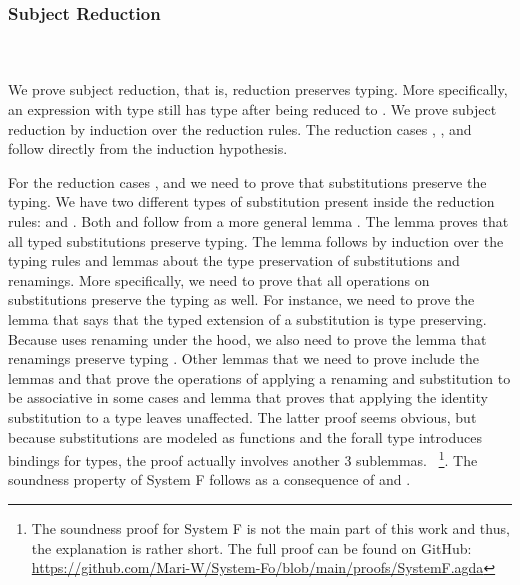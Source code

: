 \subsubsection{Subject Reduction}\hfill\\\\
We prove subject reduction, that is, reduction preserves typing. More specifically, an expression  with type  still has type  after being reduced to . We prove subject reduction by induction over the reduction rules. 
\FSubjectReduction
The  reduction cases , ,  and  follow directly from the induction hypothesis. 

\noindent For the  reduction cases ,  and  we need to prove that substitutions preserve the typing. We have two different types of substitution present inside the reduction rules:  \Data{[}  \Data{]} and  \Data{[}  \Data{]}.
Both  and  follow from a more general lemma . The lemma  proves that all typed substitutions preserve typing.
\Fpreserves
The lemma  follows by induction over the typing rules and lemmas about the type preservation of substitutions and renamings. 
More specifically, we need to prove that all operations on substitutions preserve the typing as well. 
For instance, we need to prove the lemma  that says that the typed extension of a substitution  is type preserving. Because  uses renaming under the hood, we also need to prove the lemma that renamings preserve typing . Other lemmas that we need to prove include the lemmas  and  that prove the operations of applying a renaming and substitution to be associative in some cases and lemma  that proves that applying the identity substitution to a type  leaves  unaffected. The latter proof seems obvious, but because substitutions are modeled as functions and the forall type introduces bindings for types, the proof actually involves another 3 sublemmas.
~\footnote{The soundness proof for System F is not the main part of this work and thus, the explanation is rather short. The full proof can be found on GitHub: \url{https://github.com/Mari-W/System-Fo/blob/main/proofs/SystemF.agda}}.
\noindent The soundness property of System F follows as a consequence of  and . 